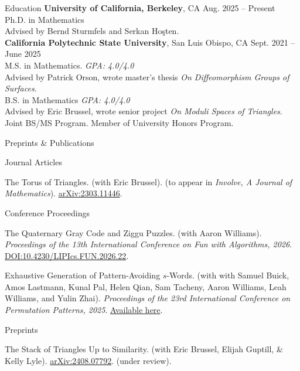 \documentclass[
	11pt, %
]{cv} %
\begin{document}
\begin{rSection}{Education}
	\textbf{University of California, Berkeley}, CA \hfill Aug. 2025 -- Present \\
	Ph.D. in Mathematics \\
	\-\hspace{1cm}Advised by Bernd Sturmfels and Serkan Ho\c{s}ten.\\

	\textbf{California Polytechnic State University}, San Luis Obispo, CA \hfill Sept. 2021 -- June 2025 \\
	M.S. in  Mathematics. \hfill \textit{GPA: 4.0/4.0} \\
	\-\hspace{1cm}Advised by Patrick Orson, wrote master's thesis \textit{On Diffeomorphism Groups of Surfaces}.\\
	B.S. in Mathematics \hfill \textit{GPA: 4.0/4.0} \\
	\-\hspace{1cm}Advised by Eric Brussel, wrote senior project \textit{On Moduli Spaces of Triangles}.\\
	\-\hspace{1cm}Joint BS/MS Program. Member of University Honors Program.
\end{rSection}

\begin{rSection}{Preprints \& Publications}
	\begin{rSubsectionNumbered}{Journal Articles}
		\item The Torus of Triangles. (with Eric Brussel). (to appear in \emph{Involve, A Journal of Mathematics}).	\href{http://arxiv.org/abs/2303.11446}{arXiv:2303.11446}.
	\end{rSubsectionNumbered}
	\begin{rSubsectionNumbered}{Conference Proceedings}
		\item The Quaternary Gray Code and Ziggu Puzzles. (with Aaron Williams). \textit{Proceedings of the 13th International Conference on Fun with Algorithms, 2026}.  \href{https://doi.org/10.4230/LIPIcs.FUN.2026.22}{DOI:10.4230/LIPIcs.FUN.2026.22}.
		\item Exhaustive Generation of Pattern-Avoiding $s$-Words. (with with Samuel Buick, Amos Lastmann, Kunal Pal, Helen Qian, Sam Tacheny, Aaron Williams, Leah Williams, and Yulin Zhai). \textit{Proceedings of the 23rd International Conference on Permutation Patterns, 2025}. \href{https://sites.cs.st-andrews.ac.uk/pp25/program/booklet-pp25.pdf}{Available here}.
	\end{rSubsectionNumbered}
	\begin{rSubsectionNumbered}{Preprints}
		\item The Stack of Triangles Up to Similarity. (with Eric Brussel, Elijah Guptill, \& Kelly Lyle). \href{http://arxiv.org/abs/2408.07792}{arXiv:2408.07792}. (under review).
	\end{rSubsectionNumbered}
\end{rSection}
\end{document}
